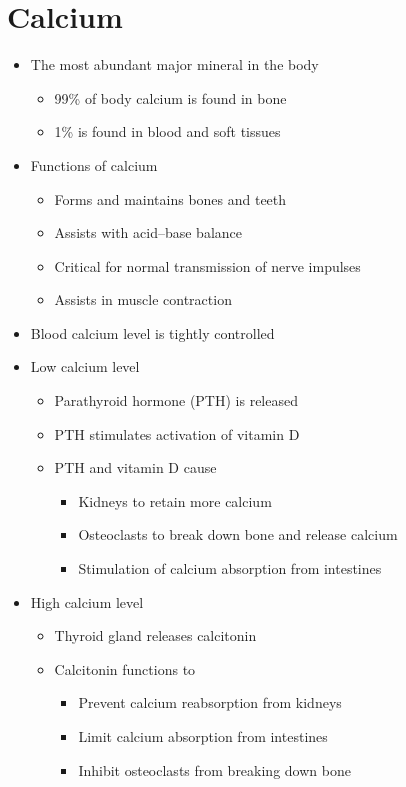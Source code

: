 \documentclass[title={Chapter 9}]{fdsn201notes}
\begin{document}
\section{Calcium}\label{sec:calcium}
\begin{itemize}
	\item The most abundant major mineral in the body
	\begin{itemize}
		\item 99\% of body calcium is found in bone
		\item 1\% is found in blood and soft tissues
	\end{itemize}
	\item Functions of calcium
	\begin{itemize}
		\item Forms and maintains bones and teeth
		\item Assists with acid--base balance
		\item Critical for normal transmission of nerve impulses
		\item Assists in muscle contraction
	\end{itemize}
	\item Blood calcium level is tightly controlled
	\item Low calcium level
	\begin{itemize}
		\item Parathyroid hormone (PTH) is released
		\item PTH stimulates activation of vitamin D
		\item PTH and vitamin D cause
		\begin{itemize}
			\item Kidneys to retain more calcium
			\item Osteoclasts to break down bone and release calcium
			\item Stimulation of calcium absorption from intestines
		\end{itemize}
	\end{itemize}
	\item High calcium level
	\begin{itemize}
		\item Thyroid gland releases calcitonin
		\item Calcitonin functions to
		\begin{itemize}
			\item Prevent calcium reabsorption from kidneys
			\item Limit calcium absorption from intestines
			\item Inhibit osteoclasts from breaking down bone
		\end{itemize}
	\end{itemize}
\end{itemize}
\end{document}
